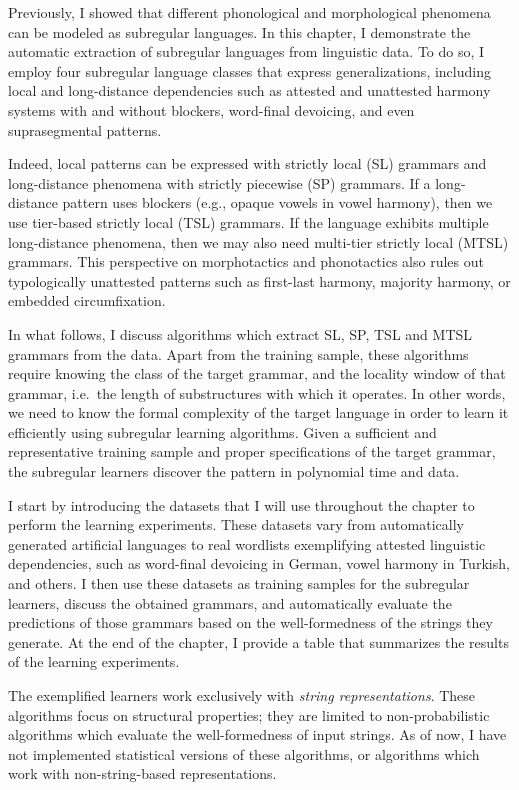 Previously, I showed that different phonological and morphological phenomena can be modeled as subregular languages.
In this chapter, I demonstrate the automatic extraction of subregular languages from linguistic data.
To do so, I employ four subregular language classes that express
generalizations, including local and long-distance dependencies such as attested and unattested harmony systems with and without blockers, word-final devoicing, and even suprasegmental patterns.

Indeed, local patterns can be expressed with strictly local (SL) grammars and long-distance phenomena with strictly piecewise (SP) grammars.
If a long-distance pattern uses blockers (e.g., opaque vowels in vowel harmony), then we use tier-based strictly local (TSL) grammars.
If the language exhibits multiple long-distance phenomena, then we may also need  multi-tier strictly local (MTSL) grammars.
This perspective on morphotactics and phonotactics also rules out typologically unattested patterns such as first-last harmony, majority harmony, or embedded circumfixation.

In what follows, I discuss algorithms which extract SL, SP, TSL and MTSL grammars from the data.
Apart from the training sample, these algorithms require knowing the class of the target grammar, and the locality window of that grammar, i.e.\ the length of substructures with which it operates.
In other words, we need to know the formal complexity of the target language in order to learn it efficiently using subregular learning algorithms.
Given a sufficient and representative training sample and proper specifications of the target grammar, the subregular learners discover the pattern in polynomial time and data.

I start by introducing the datasets that I will use throughout the chapter to perform the learning experiments.
These datasets vary from automatically generated artificial languages to real wordlists exemplifying attested linguistic dependencies, such as word-final devoicing in German, vowel harmony in Turkish, and others.
I then use these datasets as training samples for the subregular learners, discuss the obtained grammars, and automatically evaluate the predictions of those grammars based on the well-formedness of the strings they generate.
At the end of the chapter, I provide a table that summarizes the results of the learning experiments.

The exemplified learners work exclusively with \emph{string representations}.
These algorithms focus on structural properties; they are limited to non-probabilistic algorithms which evaluate the well-formedness of input strings.
As of now, I have not implemented statistical versions of these algorithms, or algorithms which work with non-string-based representations.


